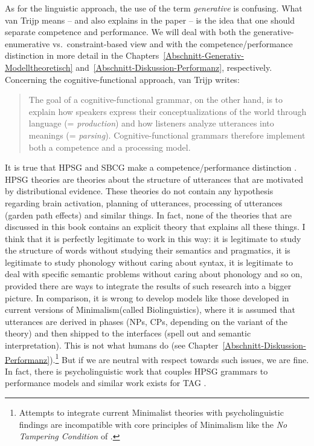 \label{sec-performance-cxg}

As for the linguistic approach, the use of the term \emph{generative} is
confusing. What van Trijp means -- and also explains in the paper -- is the idea that one should
separate competence and performance. We will deal with both the generative-enumerative
vs.\ constraint-based view and with the competence/performance distinction in more detail in the
Chapters~\ref{Abschnitt-Generativ-Modelltheoretisch} and~\ref{Abschnitt-Diskussion-Performanz},
respectively. Concerning the cognitive-functional approach, van Trijp writes:
\begin{quote}
The goal of a cognitive-functional grammar, on the other hand, is to explain
how speakers express their conceptualizations of the world through language
(= \emph{production}) and how listeners analyze utterances into meanings (= \emph{parsing}).
Cognitive-functional grammars therefore implement both a competence and a
processing model. \citep[]{vanTrijp2013a}
\end{quote}
\largerpage
It is true that HPSG and SBCG make a competence/performance distinction \citep{SW2011a}. HPSG
theories are theories about the structure of utterances that are motivated by distributional
evidence. These theories do not contain any hypothesis regarding brain activation, planning of
utterances, processing of utterances (garden path effects) and similar things. In fact, none of the
theories that are discussed in this book contains an explicit theory that explains all these
things. I think that it is perfectly legitimate to work in this way: it is legitimate to study the
structure of words without studying their semantics and pragmatics, it is legitimate to study
phonology without caring about syntax, it is legitimate to deal with specific semantic problems
without caring about phonology and so on, provided there are ways to integrate the results of such
research into a bigger picture. In comparison, it is wrong to develop models like those developed in current
versions of Minimalism\indexmp (called Biolinguistics), where it is assumed that utterances are derived in
phases (NPs, CPs, depending on the variant of the theory) and then shipped to the interfaces (spell
out and semantic interpretation). This is not what humans do (see
Chapter~\ref{Abschnitt-Diskussion-Performanz}).\footnote{%
Attempts to integrate current Minimalist theories with psycholinguistic findings \citep{Phillips2003a} are
incompatible with core principles of Minimalism like the \emph{No Tampering Condition} of \citet{Chomsky2008a}.
}
But if we are neutral with respect towards such
issues, we are fine. In fact, there is psycholinguistic work that couples HPSG grammars to
performance models \citep{Konieczny96a-u} and similar work exists for TAG \citep{SJ93a,DK2008a-u}. 

